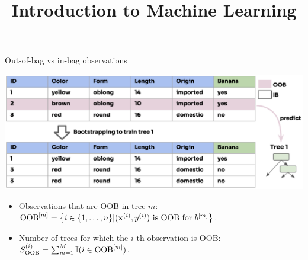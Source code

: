 \documentclass[11pt,compress,t,notes=noshow,xcolor=table]{beamer}
\title{Introduction to Machine Learning}
\begin{document}

\begin{vbframe}{Out-of-bag vs in-bag observations}
  
\begin{center}
\includegraphics[width=\textwidth]{figure_man/forest-oob.png}
\end{center}

\begin{itemize}
  \item Observations that are OOB in tree $m$: $\text{OOB}^{[m]} = \left \{i \in \{1, \ldots, n\} | (\mathbf{x}^{(i)}, y^{(i)}) \text{ is OOB for } b^{[m]} \right \}$.
  \item Number of trees for which the $i$-th observation is OOB: $S_{\text{OOB}}^{(i)} = \sum_{m = 1}^M \mathbb{I}(i \in \text{OOB}^{[m]})$.
\end{itemize}

\end{vbframe}
\end{document}
